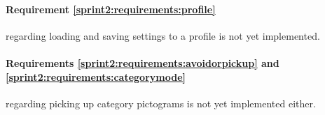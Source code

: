 \paragraph{Requirement \ref{sprint2:requirements:profile}} regarding loading and saving settings to a profile is not yet implemented.

\paragraph{Requirements \ref{sprint2:requirements:avoidorpickup} and \ref{sprint2:requirements:categorymode}} regarding picking up category pictograms is not yet implemented either.